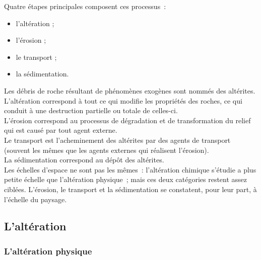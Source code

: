 \documentclass[a4paper,11pt]{article}
\begin{document}
Quatre étapes principales composent ces processus~:
\begin{itemize}
  \item l'altération ;
  \item l'érosion ;
  \item le transport ;
  \item la sédimentation.
\end{itemize}
Les débris de roche résultant de phénomènes exogènes sont nommés des altérites. \\
L'altération correspond à tout ce qui modifie les propriétés des roches, ce qui conduit à une destruction partielle ou totale de celles-ci. \\
L'érosion correspond au processus de dégradation et de transformation du relief qui est causé par tout agent externe. \\
Le transport est l'acheminement des altérites par des agents de transport (souvent les mêmes que les agents externes qui réalisent l'érosion). \\
La sédimentation correspond au dépôt des altérites. \\

Les échelles d'espace ne sont pas les mêmes~: l'altération chimique s'étudie a plus petite échelle que l'altération physique~; mais ces deux catégories restent assez ciblées.
L'érosion, le transport et la sédimentation se constatent, pour leur part, à l'échelle du paysage. \\

\subsection{L'altération}
\subsubsection{L'altération physique}
\end{document}
